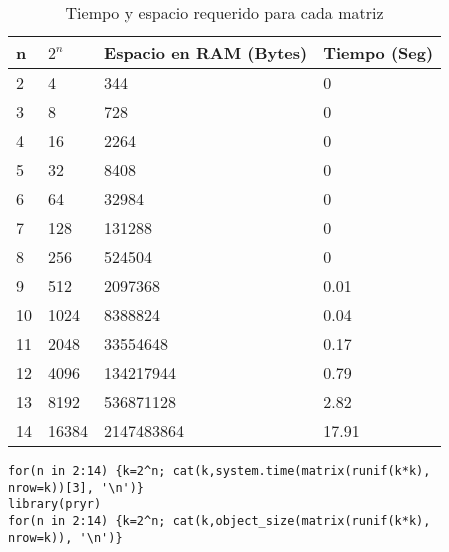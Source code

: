\documentclass{article}
\begin{document}
\begin{table}[h]
\centering
\begin{tabular}{|l|l|l|l|}
\hline
n  & $2^n$ & Espacio en RAM (Bytes) & Tiempo (Seg) \\ \hline
2  & 4                    & 344                    & 0            \\ \hline
3  & 8                    & 728                    & 0            \\ \hline
4  & 16                   & 2264                   & 0            \\ \hline
5  & 32                   & 8408                   & 0            \\ \hline
6  & 64                   & 32984                  & 0            \\ \hline
7  & 128                  & 131288                 & 0            \\ \hline
8  & 256                  & 524504                 & 0            \\ \hline
9  & 512                  & 2097368                & 0.01         \\ \hline
10 & 1024                 & 8388824                & 0.04         \\ \hline
11 & 2048                 & 33554648               & 0.17         \\ \hline
12 & 4096                 & 134217944              & 0.79         \\ \hline
13 & 8192                 & 536871128              & 2.82         \\ \hline
14 & 16384                & 2147483864             & 17.91        \\ \hline
\end{tabular}
\caption{Tiempo y espacio requerido para cada matriz}
\label{tabla 1}
\end{table}

\lstset{language=Python}
\lstset{frame=lines}
\lstset{basicstyle=\footnotesize}
\begin{lstlisting}
for(n in 2:14) {k=2^n; cat(k,system.time(matrix(runif(k*k),
nrow=k))[3], '\n')}
library(pryr)
for(n in 2:14) {k=2^n; cat(k,object_size(matrix(runif(k*k),
nrow=k)), '\n')}
\end{lstlisting}
\end{document}

